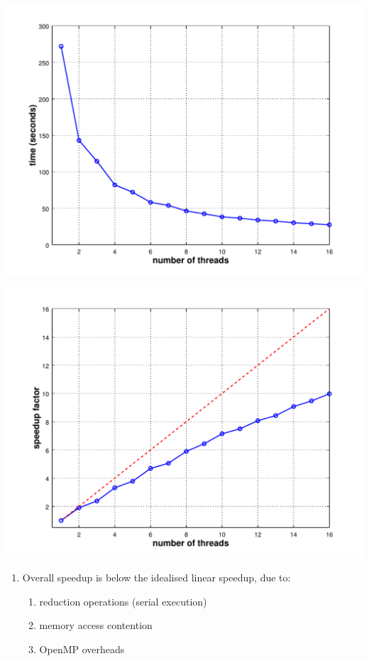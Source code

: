 \documentclass[usenames,dvipsnames]{beamer}
\begin{document}
\begin{frame}
\centering
\begin{minipage}{\textwidth}
  \centering
  \begin{minipage}{0.40\textwidth}
    \centering
    \includegraphics[width=1.1\textwidth]{plot1.pdf}
  \end{minipage}%
  \begin{minipage}{0.40\textwidth}
    \centering
    \includegraphics[width=1.1\textwidth]{plot2.pdf}
  \end{minipage}
\end{minipage}

\begin{enumerate}[{~~$\boldsymbol{\bullet}$}]

\item Overall speedup is below the idealised linear speedup, due to:


\begin{enumerate}[{$\boldsymbol{\rightarrow}$}]
\scriptsize
\item reduction operations (serial execution)
\item memory access contention
\item OpenMP overheads
\end{enumerate}

\end{enumerate}


\end{frame}
\end{document}
